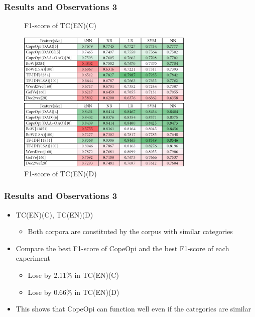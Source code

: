 \documentclass[mathserif]{beamer}
\newcommand\expfigvspace{-2.5ex}
\begin{document}
\begin{frame}
\frametitle{Results and Observations 3}
	\vspace{\expfigvspace}
	\begin{figure}
	\centering
	\caption{F1-score of TC(EN)(C)}
	\includegraphics[width=0.75\textwidth]{./figure/01B3.png}
	\caption{F1-score of TC(EN)(D)}
	\includegraphics[width=0.75\textwidth]{./figure/01B4.png}
	\end{figure}
\end{frame}
\begin{frame}
\frametitle{Results and Observations 3}
	\begin{itemize}
	\item TC(EN)(C), TC(EN)(D)
		\begin{itemize}
		\item Both corpora are constituted by the corpus with similar categories
		\end{itemize}
	\item Compare the best F1-score of CopeOpi and the best F1-score of each experiment
		\begin{itemize}
		\item Lose by 2.11\% in TC(EN)(C)
		\item Lose by 0.66\% in TC(EN)(D)
		\end{itemize}
	\item This shows that CopeOpi can function well even if the categories are similar
	\end{itemize}
\end{frame}
\end{document}
